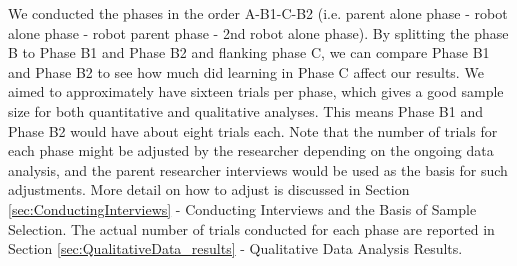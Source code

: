 We conducted the phases in the order A-B1-C-B2 (i.e. parent alone phase - robot alone phase - robot parent phase - 2nd robot alone phase).  By splitting the phase B to Phase B1 and Phase B2 and flanking phase C, we can compare Phase B1 and Phase B2 to see how much did learning in Phase C affect our results.  We aimed to approximately have sixteen trials per phase, which gives a good sample size for both quantitative and qualitative analyses.  This means Phase B1 and Phase B2 would have about eight trials each.  Note that the number of trials for each phase might be adjusted by the researcher depending on the ongoing data analysis, and the parent researcher interviews would be used as the basis for such adjustments.  More detail on how to adjust is discussed in Section \ref{sec:ConductingInterviews} - Conducting Interviews and the Basis of Sample Selection.  The actual number of trials conducted for each phase are reported in Section \ref{sec:QualitativeData_results} - Qualitative Data Analysis Results.



